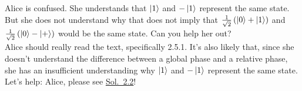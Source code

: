 \section{}

Alice is confused.
She understands that $\ket{1}$ and $-\ket{1}$ represent the same state.
But she does not understand why that does not imply that $\tfrac{1}{\sqrt{2}} \left ( \ket{0} + \ket{1} \right )$ and $\tfrac{1}{\sqrt{2}} \left ( \ket{0} - \ket{+} \right )$
would be the same state.
Can you help her out? \\

{\Sol}
Alice should really read the text, specifically 2.5.1.
It's also likely that, since she doesn't understand the difference between a global phase and a relative
phase, she has an insufficient understanding why $\ket{1}$ and $-\ket{1}$ represent the same state.
Let's help: Alice, please see \hyperlink{sol:2p2}{Sol.~2.2}!
